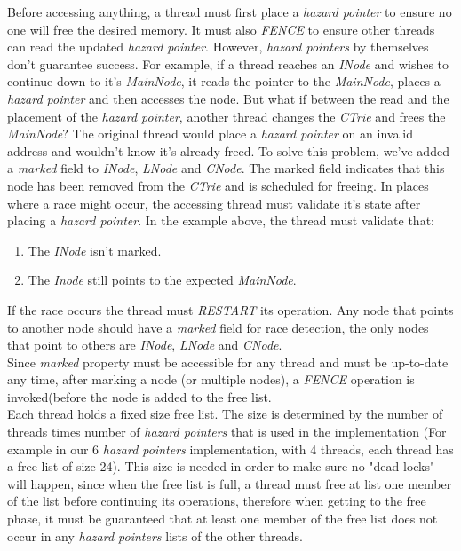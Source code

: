 \documentclass[conference]{IEEEtran}
\begin{document}
	Before accessing anything, a thread must first place a \textit{hazard pointer} to ensure no one will free the desired memory. It must also \textit{FENCE} to ensure other threads can read the updated \textit{hazard pointer}. However, \textit{hazard pointers} by themselves don't guarantee success. For example, if a thread reaches an \textit{INode} and wishes to continue down to it's \textit{MainNode}, it reads the pointer to the \textit{MainNode}, places a \textit{hazard pointer} and then accesses the node. But what if between the read and the placement of the \textit{hazard pointer}, another thread changes the \textit{CTrie} and frees the \textit{MainNode}? The original thread would place a \textit{hazard pointer} on an invalid address and wouldn't know it's already freed. To solve this problem, we've added a \textit{marked} field to \textit{INode}, \textit{LNode} and \textit{CNode}. The marked field indicates that this node has been removed from the \textit{CTrie} and is scheduled for freeing. In places where a race might occur, the accessing thread must validate it's state after placing a \textit{hazard pointer}. In the example above, the thread must validate that:
	\begin{enumerate}
		\item The \textit{INode} isn't marked.
		\item The \textit{Inode} still points to the expected \textit{MainNode}.		
	\end{enumerate}
	If the race occurs the thread must \textit{RESTART} its operation. Any node that points to another node should have a \textit{marked} field for race detection, the only nodes that point to others are \textit{INode}, \textit{LNode} and \textit{CNode}. \\
	Since \textit{marked} property must be accessible for any thread and must be up-to-date any time, after marking a node (or multiple nodes), a \textit{FENCE} operation is invoked(before the node is added to the free list. \\
	Each thread holds a fixed size free list. The size is determined by the number of threads times number of \textit{hazard pointers} that is used in the implementation (For example in our 6 \textit{hazard pointers} implementation, with 4 threads, each thread has a free list of size 24). This size is needed in order to make sure no "dead locks" will happen, since when the free list is full, a thread must free at list one member of the list before continuing its operations, therefore when getting to the free phase, it must be guaranteed that at least one member of the free list does not occur in any \textit{hazard pointers} lists of the other threads.
	
\end{document}
